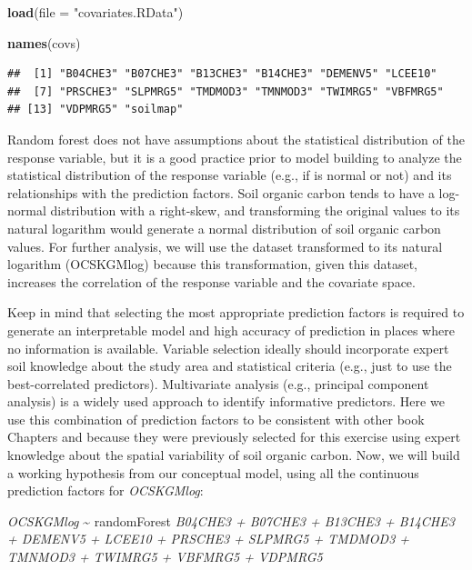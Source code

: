 \documentclass[10pt,b5paper,]{book}
\newenvironment{Shaded}{\begin{snugshade}}{\end{snugshade}}
\newcommand{\DataTypeTok}[1]{\textcolor[rgb]{0.13,0.29,0.53}{#1}}
\newcommand{\KeywordTok}[1]{\textcolor[rgb]{0.13,0.29,0.53}{\textbf{#1}}}
\newcommand{\NormalTok}[1]{#1}
\newcommand{\StringTok}[1]{\textcolor[rgb]{0.31,0.60,0.02}{#1}}
\theoremstyle{definition}
\theoremstyle{definition}
\theoremstyle{definition}
\theoremstyle{remark}
\begin{document}
\begin{Shaded}
\begin{Highlighting}[]
\KeywordTok{load}\NormalTok{(}\DataTypeTok{file =} \StringTok{"covariates.RData"}\NormalTok{)}

\KeywordTok{names}\NormalTok{(covs)}
\end{Highlighting}
\end{Shaded}

\begin{verbatim}
##  [1] "B04CHE3" "B07CHE3" "B13CHE3" "B14CHE3" "DEMENV5" "LCEE10" 
##  [7] "PRSCHE3" "SLPMRG5" "TMDMOD3" "TMNMOD3" "TWIMRG5" "VBFMRG5"
## [13] "VDPMRG5" "soilmap"
\end{verbatim}

Random forest does not have assumptions about the statistical
distribution of the response variable, but it is a good practice prior
to model building to analyze the statistical distribution of the
response variable (e.g., if is normal or not) and its relationships with
the prediction factors. Soil organic carbon tends to have a log-normal
distribution with a right-skew, and transforming the original values to
its natural logarithm would generate a normal distribution of soil
organic carbon values. For further analysis, we will use the dataset
transformed to its natural logarithm (OCSKGMlog) because this
transformation, given this dataset, increases the correlation of the
response variable and the covariate space.

Keep in mind that selecting the most appropriate prediction factors is
required to generate an interpretable model and high accuracy of
prediction in places where no information is available. Variable
selection ideally should incorporate expert soil knowledge about the
study area and statistical criteria (e.g., just to use the
best-correlated predictors). Multivariate analysis (e.g., principal
component analysis) is a widely used approach to identify informative
predictors. Here we use this combination of prediction factors to be
consistent with other book Chapters and because they were previously
selected for this exercise using expert knowledge about the spatial
variability of soil organic carbon. Now, we will build a working
hypothesis from our conceptual model, using all the continuous
prediction factors for \emph{OCSKGMlog}:

\emph{OCSKGMlog} \textasciitilde{} randomForest \emph{B04CHE3 + B07CHE3
+ B13CHE3 + B14CHE3 + DEMENV5 + LCEE10 + PRSCHE3 + SLPMRG5 + TMDMOD3 +
TMNMOD3 + TWIMRG5 + VBFMRG5 + VDPMRG5}
\end{document}
